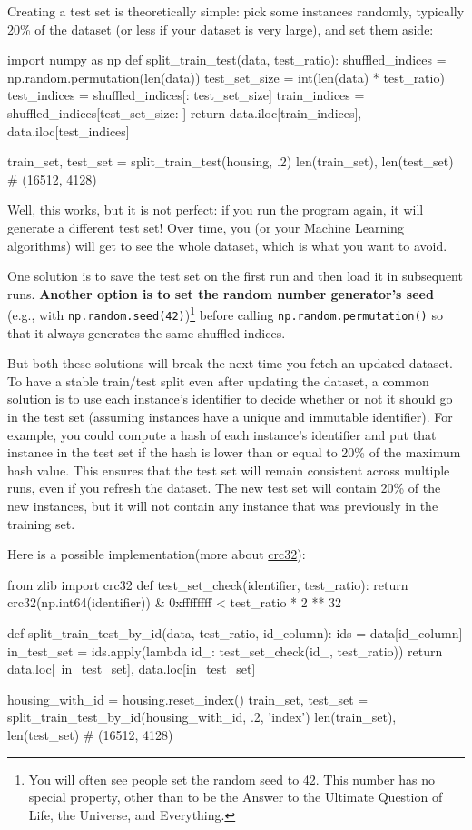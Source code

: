 Creating a test set is theoretically simple: pick some instances randomly, typically
20\% of the dataset (or less if your dataset is very large), and set them aside:
\begin{pyc}
import numpy as np
def split_train_test(data, test_ratio):
    shuffled_indices = np.random.permutation(len(data))
    test_set_size = int(len(data) * test_ratio)
    test_indices = shuffled_indices[: test_set_size]
    train_indices = shuffled_indices[test_set_size: ]
    return data.iloc[train_indices], data.iloc[test_indices]

train_set, test_set = split_train_test(housing, .2)
len(train_set), len(test_set)
# (16512, 4128)
\end{pyc}

Well, this works, but it is not perfect: if you run the program again, it will generate a different test set! Over time, you (or your Machine Learning algorithms) will get to
see the whole dataset, which is what you want to avoid.

One solution is to save the test set on the first run and then load it in subsequent
runs. \textbf{Another option is to set the random number generator's seed} (e.g., with \verb|np.random.seed(42)|)\footnote{You will often see people set the random seed to 42. This number has no special property, other than to be the
Answer to the Ultimate Question of Life, the Universe, and Everything.} before calling \verb|np.random.permutation()| so that it always generates
the same shuffled indices.

But both these solutions will break the next time you fetch an updated dataset. To
have a stable train/test split even after updating the dataset, a common solution is to
use each instance's identifier to decide whether or not it should go in the test set
(assuming instances have a unique and immutable identifier). For example, you could
compute a hash of each instance's identifier and put that instance in the test set if the
hash is lower than or equal to 20\% of the maximum hash value. This ensures that the
test set will remain consistent across multiple runs, even if you refresh the dataset.
The new test set will contain 20\% of the new instances, but it will not contain any
instance that was previously in the training set.

Here is a possible implementation(more about \href{https://baike.baidu.com/item/CRC32/7460858}{crc32}):
\begin{pyc}
from zlib import crc32
def test_set_check(identifier, test_ratio):
    return crc32(np.int64(identifier)) & 0xffffffff < test_ratio * 2 ** 32

def split_train_test_by_id(data, test_ratio, id_column):
    ids = data[id_column]
    in_test_set = ids.apply(lambda id_: test_set_check(id_, test_ratio))
    return data.loc[~in_test_set], data.loc[in_test_set]

housing_with_id = housing.reset_index()
train_set, test_set = split_train_test_by_id(housing_with_id, .2, 'index')
len(train_set), len(test_set)
# (16512, 4128)
\end{pyc}

